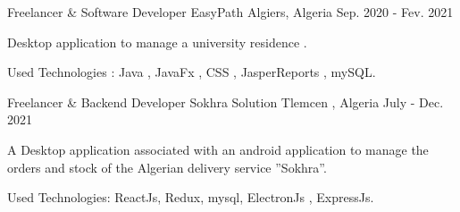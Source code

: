 

\begin{cventries}

  \cventry
    {Freelancer \& Software Developer} %
    {EasyPath} %
    {Algiers, Algeria} %
    {Sep. 2020 - Fev. 2021} %
    {
      \begin{cvitems} %
        \item {Desktop application to manage a university residence .}
        \item {Used Technologies : Java , JavaFx , CSS , JasperReports , mySQL.}
      \end{cvitems}
    }

  \cventry
    {Freelancer \& Backend Developer} %
    {Sokhra Solution} %
    {Tlemcen , Algeria} %
    {July - Dec. 2021} %
    {
      \begin{cvitems} %
        \item {A Desktop application associated with an android application to manage the orders and stock of the Algerian delivery service ”Sokhra”.}
        \item {Used Technologies: ReactJs, Redux, mysql, ElectronJs , ExpressJs.}
      \end{cvitems}
    }

\end{cventries}
